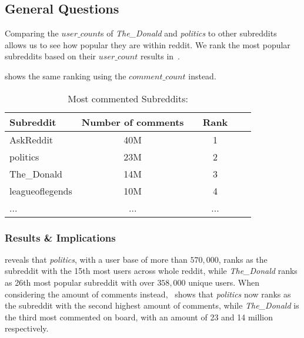 \documentclass[runningheads,a4paper]{llncs}
\begin{document}
	\subsection{General Questions}\label{sub:cross_subreddit_general}
	
	Comparing the $user\_count$s of \textit{The\_Donald} and \textit{politics} to other subreddits allows us to see
	how popular they are within reddit.
	We rank the most popular subreddits based on their $user\_count$ results in~.
	
	 shows the same ranking using the $comment\_count$ instead.
	
	\begin{table}
		\caption{Most commented Subreddits:}
		\centering
		\setlength{\tabcolsep}{5px}
		\begin{tabular}{lccccc}
			\hline\hline
			Subreddit & Number of comments & & Rank & \\
			\hline
			AskReddit & 40M & & 1 \\
			politics & 23M & & 2 \\
			The\_Donald & 14M & & 3 \\
			leagueoflegends & 10M & & 4 \\
			... & ... & & ...\\
			\hline\hline
		\end{tabular}
		\label{table:comment_highscore}
	\end{table}
	
	\subsubsection{Results \& Implications}
	 reveals that \textit{politics}, with a user base of more than $570,000$, ranks as the subreddit with the 15th most users across whole reddit, while \textit{The\_Donald} ranks as 26th most popular subreddit with over $358,000$ unique users.
	When considering the amount of comments instead,~ shows that \textit{politics} now ranks as the subreddit with the second highest amount of comments, while \textit{The\_Donald} is the third most commented on board, with an amount of 23 and 14 million respectively.
	
\end{document}
